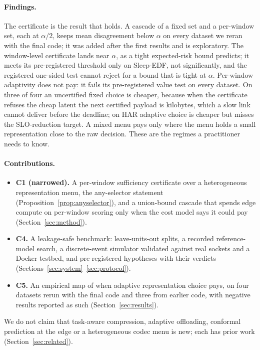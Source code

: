 \paragraph{Findings.} The certificate is the result that holds. A cascade of a fixed set and a
per-window set, each at $\alpha/2$, keeps mean disagreement below $\alpha$ on every dataset we
reran with the final code; it was added after the first results and is exploratory. The
window-level certificate lands near $\alpha$, as a tight expected-risk bound predicts; it meets
its pre-registered threshold only on Sleep-EDF, not significantly, and the registered one-sided test
cannot reject for a bound that is tight at $\alpha$. Per-window adaptivity does not pay: it fails
its pre-registered value test on every dataset. On three of four an uncertified fixed choice is
cheaper, because when the certificate refuses the cheap latent the next certified payload is
kilobytes, which a slow link cannot deliver before the deadline; on HAR adaptive choice is cheaper
but misses the SLO-reduction target. A
mixed menu pays only where the menu holds a small representation close to the raw decision. These
are the regimes a practitioner needs to know.

\paragraph{Contributions.}
\begin{itemize}
  \item \textbf{C1 (narrowed).} A per-window sufficiency certificate over a heterogeneous
  representation menu, the any-selector statement (Proposition~\ref{prop:anyselector}), and a
  union-bound cascade that spends edge compute on per-window scoring only when the cost model says
  it could pay (Section~\ref{sec:method}).
  \item \textbf{C4.} A leakage-safe benchmark: leave-units-out splits, a recorded reference-model
  search, a discrete-event simulator validated against real sockets and a Docker testbed, and
  pre-registered hypotheses with their verdicts (Sections~\ref{sec:system}--\ref{sec:protocol}).
  \item \textbf{C5.} An empirical map of when adaptive representation choice pays, on four
  datasets rerun with the final code and three from earlier code, with negative results reported
  as such (Section~\ref{sec:results}).
\end{itemize}

We do not claim that task-aware compression, adaptive offloading, conformal prediction at the
edge or a heterogeneous codec menu is new; each has prior work (Section~\ref{sec:related}).
